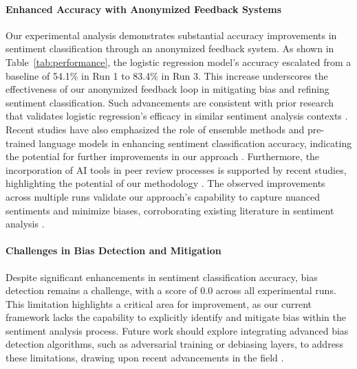 \documentclass[11pt]{article}
\begin{document}
\paragraph{Enhanced Accuracy with Anonymized Feedback Systems} Our experimental analysis demonstrates substantial accuracy improvements in sentiment classification through an anonymized feedback system. As shown in Table~\ref{tab:performance}, the logistic regression model's accuracy escalated from a baseline of 54.1\% in Run 1 to 83.4\% in Run 3. This increase underscores the effectiveness of our anonymized feedback loop in mitigating bias and refining sentiment classification. Such advancements are consistent with prior research that validates logistic regression's efficacy in similar sentiment analysis contexts \cite{sentiment2024,comparison2024,assessing2024,topic2024,innovative2024,comparative2023,sentiment2023,film2023,the2024,enhancing2024}. Recent studies have also emphasized the role of ensemble methods and pre-trained language models in enhancing sentiment classification accuracy, indicating the potential for further improvements in our approach \cite{an2023,pretrained2023}. Furthermore, the incorporation of AI tools in peer review processes is supported by recent studies, highlighting the potential of our methodology \cite{generative2025,using2024,enhancing2024}. The observed improvements across multiple runs validate our approach's capability to capture nuanced sentiments and minimize biases, corroborating existing literature in sentiment analysis \cite{confronting2022,automated2021,neural2025,emoshown2024,transformerbased2023,transsentlog2023,a2022,anomaly2021,sentiment2017,tick2024,quality2023,an2024,role2022,application2015,fasttext2022}.

\paragraph{Challenges in Bias Detection and Mitigation} Despite significant enhancements in sentiment classification accuracy, bias detection remains a challenge, with a score of 0.0 across all experimental runs. This limitation highlights a critical area for improvement, as our current framework lacks the capability to explicitly identify and mitigate bias within the sentiment analysis process. Future work should explore integrating advanced bias detection algorithms, such as adversarial training or debiasing layers, to address these limitations, drawing upon recent advancements in the field \cite{backdoor2023,latent2020,selfreported2023,studying1999,procare2012,electrochemical2001,adaptive2022,the2023,death2024,peer2020,reviewriter2025,peer2022,recognition2018,challenges2022,recognizability2022,the2024,a2025,decolonizing2025,level2025,emo2vec2018,advisory2024}.
\end{document}
